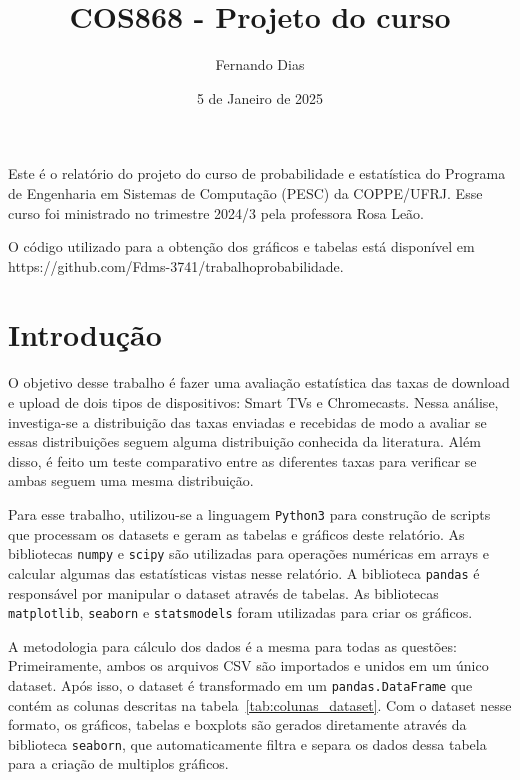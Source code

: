 \documentclass{article}
\title{COS868 - Projeto do curso}
\author{Fernando Dias}
\date{5 de Janeiro de 2025}
\begin{document}
\maketitle

Este é o relatório do projeto do curso de probabilidade e estatística do Programa de Engenharia em Sistemas de Computação (PESC) da COPPE/UFRJ. Esse curso foi ministrado no trimestre 2024/3 pela professora Rosa Leão.

O código utilizado para a obtenção dos gráficos e tabelas está disponível em https://github.com/Fdms-3741/trabalhoprobabilidade.

\section{Introdução}

O objetivo desse trabalho é fazer uma avaliação estatística das taxas de download e upload de dois tipos de dispositivos: Smart TVs e Chromecasts. Nessa análise, investiga-se a distribuição das taxas enviadas e recebidas de modo a avaliar se essas distribuições seguem alguma distribuição conhecida da literatura. Além disso, é feito um teste comparativo entre as diferentes taxas para verificar se ambas seguem uma mesma distribuição.

Para esse trabalho, utilizou-se a linguagem \texttt{Python3} para construção de scripts que processam os datasets e geram as tabelas e gráficos deste relatório. As bibliotecas \texttt{numpy} e \texttt{scipy} são utilizadas para operações numéricas em arrays e calcular algumas das estatísticas vistas nesse relatório. A biblioteca \texttt{pandas} é responsável por manipular o dataset através de tabelas. As bibliotecas \texttt{matplotlib}, \texttt{seaborn} e \texttt{statsmodels} foram utilizadas para criar os gráficos.

A metodologia para cálculo dos dados é a mesma para todas as questões: Primeiramente, ambos os arquivos CSV são importados e unidos em um único dataset. Após isso, o dataset é transformado em um \texttt{pandas.DataFrame} que contém as colunas descritas na tabela~\ref{tab:colunas_dataset}. Com o dataset nesse formato, os gráficos, tabelas e boxplots são gerados diretamente através da biblioteca \texttt{seaborn}, que automaticamente filtra e separa os dados dessa tabela para a criação de multiplos gráficos.
\end{document}
